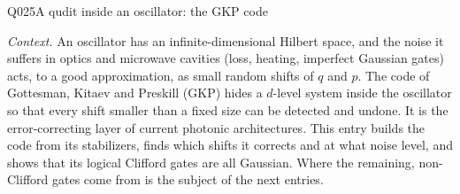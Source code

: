 \begin{entry}{Q025}{A qudit inside an oscillator: the GKP code}


\begin{problem}
\emph{Context.} An oscillator has an infinite-dimensional Hilbert space, and the noise it
suffers in optics and microwave cavities (loss, heating, imperfect Gaussian gates) acts, to a
good approximation, as small random shifts of $q$ and $p$. The code of Gottesman, Kitaev and
Preskill (GKP) hides a $d$-level system inside the oscillator so that every shift smaller
than a fixed size can be detected and undone. It is the error-correcting layer of current
photonic architectures. This entry builds the code from its stabilizers, finds which shifts
it corrects and at what noise level, and shows that its logical Clifford gates are all
Gaussian. Where the remaining, non-Clifford gates come from is the subject of the next
entries.


\end{problem}
\end{entry}
